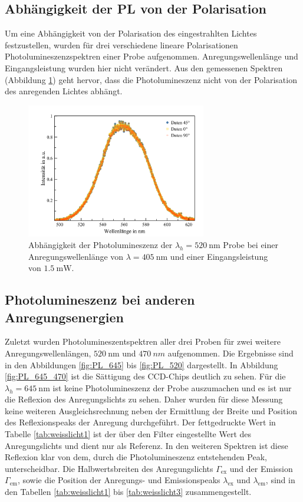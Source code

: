 \subsection{Abhängigkeit der PL von der Polarisation}
\label{sec:Polarisation}
Um eine Abhängigkeit von der Polarisation des eingestrahlten Lichtes festzustellen,
wurden für drei verschiedene lineare Polarisationen Photolumineszenzspektren einer
Probe aufgenommen. Anregungswellenlänge und  Eingangsleistung wurden hier nicht verändert.
Aus den gemessenen Spektren (Abbildung \ref{fig:Polarisation}) geht hervor, dass die
Photolumineszenz nicht von der Polarisation des anregenden Lichtes abhängt.
\begin{figure}[H]
  \centering
  \includegraphics[width=0.7\textwidth]{plots/Poldepplot.png}
  \caption{Abhängigkeit der Photolumineszenz der $\lambda_h=\SI{520}{\nano\meter}$
   Probe bei einer Anregungswellenlänge von $\lambda=\SI{405}{\nano\meter}$ und einer Eingangsleistung von $\SI{1,5}{\milli\watt}$.}
   \label{fig:Polarisation}
\end{figure}

\subsection{Photolumineszenz bei anderen Anregungsenergien}
\label{subsec:34}
Zuletzt wurden Photolumineszentspektren aller drei Proben für zwei weitere
Anregungswellenlängen, $\SI{520}{\nano\meter}$ und $\SI{470}{nm}$ aufgenommen.
Die Ergebnisse sind in den Abbildungen \ref{fig:PL_645} bis \ref{fig:PL_520} dargestellt.
In Abbildung \ref{fig:PL_645_470} ist die Sättigung des CCD-Chips deutlich zu sehen.
Für die $\lambda_h=\SI{645}{\nano\meter}$ ist keine Photolumineszenz der
Probe auszumachen und es ist nur die Reflexion des Anregungslichts zu sehen. Daher wurden für diese Messung keine weiteren Ausgleichsrechnung neben der Ermittlung der Breite und Position des Reflexionspeaks der Anregung durchgeführt. Der fettgedruckte Wert in Tabelle \ref{tab:weisslicht1} ist der über den Filter eingestellte Wert des Anregungslichts und dient nur als Referenz.
In den weiteren Spektren ist diese Reflexion klar von dem,
durch die Photolumineszenz entstehenden Peak, unterscheidbar.
Die Halbwertsbreiten des Anregungslichts $\Gamma_{\text{ex}}$ und der Emission $\Gamma_{\text{em}}$, sowie die Position der Anregungs- und Emissionspeaks $\lambda_{\text{ex}}$ und $\lambda_{\text{em}}$, sind in den Tabellen \ref{tab:weisslicht1} bis \ref{tab:weisslicht3} zusammengestellt.

